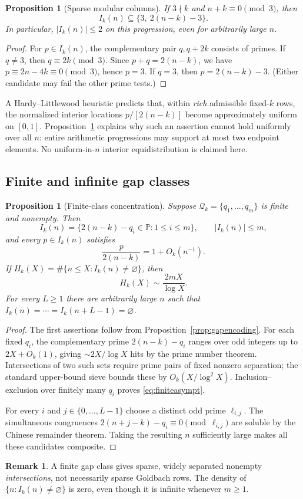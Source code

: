 \documentclass[11pt,a4paper]{article}
\newtheorem{proposition}[theorem]{Proposition}
\theoremstyle{definition}
\newtheorem{remark}[theorem]{Remark}
\newcommand{\PP}{\mathbb P}
\newcommand{\Qcal}{\mathcal Q}
\begin{document}
\begin{proposition}[Sparse modular columns]\label{prop:sparsemod}
If $3\nmid k$ and $n+k\equiv0\pmod3$, then
\[
 I_k(n)\subseteq\{3,\ 2(n-k)-3\}.
\]
In particular, $|I_k(n)|\le2$ on this progression, even for arbitrarily large $n$.
\end{proposition}
\begin{proof}
For $p\in I_k(n)$, the complementary pair $q,q+2k$ consists of primes. If $q\ne3$, then $q\equiv2k\pmod3$. Since $p+q=2(n-k)$, we have $p\equiv2n-4k\equiv0\pmod3$, hence $p=3$. If $q=3$, then $p=2(n-k)-3$. (Either candidate may fail the other prime tests.)
\end{proof}
A Hardy--Littlewood heuristic predicts that, within \emph{rich} admissible fixed-$k$ rows, the normalized interior locations $p/[2(n-k)]$ become approximately uniform on $[0,1]$. Proposition~\ref{prop:sparsemod} explains why such an assertion cannot hold uniformly over all $n$: entire arithmetic progressions may support at most two endpoint elements. No uniform-in-$n$ interior equidistribution is claimed here.

\subsection{Finite and infinite gap classes}
\begin{proposition}[Finite-class concentration]\label{prop:finite}
Suppose $\Qcal_k=\{q_1,\ldots,q_m\}$ is finite and nonempty. Then
\[
 I_k(n)=\{2(n-k)-q_i\in\PP:1\le i\le m\},\qquad |I_k(n)|\le m,
\]
and every $p\in I_k(n)$ satisfies
\[
 \frac{p}{2(n-k)}=1+O_k(n^{-1}).
\]
If $H_k(X)=\#\{n\le X:I_k(n)\ne\varnothing\}$, then
\begin{equation}\label{eq:finiteasympt}
 H_k(X)\sim\frac{2mX}{\log X}.
\end{equation}
For every $L\ge1$ there are arbitrarily large $n$ such that
$I_k(n)=\cdots=I_k(n+L-1)=\varnothing$.
\end{proposition}
\begin{proof}
The first assertions follow from Proposition~\ref{prop:gapencoding}. For each fixed $q_i$, the complementary prime $2(n-k)-q_i$ ranges over odd integers up to $2X+O_k(1)$, giving $\sim2X/\log X$ hits by the prime number theorem. Intersections of two such sets require prime pairs of fixed nonzero separation; the standard upper-bound sieve bounds these by $O_k(X/\log^2X)$. Inclusion--exclusion over finitely many $q_i$ proves \eqref{eq:finiteasympt}.

For every $i$ and $j\in\{0,\ldots,L-1\}$ choose a distinct odd prime $\ell_{i,j}$. The simultaneous congruences
$2(n+j-k)-q_i\equiv0\pmod{\ell_{i,j}}$
are soluble by the Chinese remainder theorem. Taking the resulting $n$ sufficiently large makes all these candidates composite.
\end{proof}
\begin{remark}
A finite gap class gives sparse, widely separated nonempty \emph{intersections}, not necessarily sparse Goldbach rows. The density of $\{n:I_k(n)\ne\varnothing\}$ is zero, even though it is infinite whenever $m\ge1$.
\end{remark}
\end{document}
